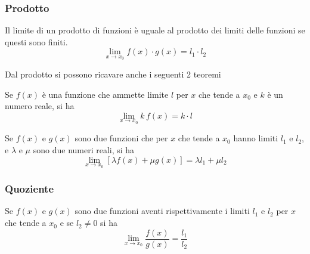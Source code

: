 \subsubsection{Prodotto}
\begin{prodottoLimiti}\hypertarget{teor:prodottoLimiti}{}
  Il limite di un prodotto di funzioni è uguale al prodotto dei limiti delle funzioni se questi sono
  finiti.
  \begin{equation*}
    \lim\limits_{x\to x_0}f(x)\cdot g(x)=l_1\cdot l_2
  \end{equation*}
\end{prodottoLimiti}
Dal prodotto si possono ricavare anche i seguenti 2 teoremi
\begin{prodottoLimiti1}
  Se $f(x)$ è una funzione che ammette limite $l$ per $x$ che tende a $x_0$ e $k$ è un numero reale,
  si ha
  \begin{equation*}
    \lim\limits_{x\to x_0}k\,f(x) = k\cdot l
  \end{equation*}
\end{prodottoLimiti1}
\begin{prodottoLimiti2}
  Se $f(x)$ e $g(x)$ sono due funzioni che per $x$ che tende a $x_0$ hanno limiti $l_1$ e $l_2$, e
  $\lambda$ e $\mu$ sono due numeri reali, si ha
  \begin{equation*}
    \lim\limits_{x\to x_0}[\lambda f(x)+\mu g(x)]=\lambda l_1+\mu l_2
  \end{equation*}
\end{prodottoLimiti2}

\subsubsection{Quoziente}
\begin{quozienteLimiti}
  Se $f(x)$ e $g(x)$ sono due funzioni aventi rispettivamente i limiti $l_1$ e $l_2$ per $x$ che 
  tende a $x_0$ e se $l_2\neq0$ si ha
  \begin{equation*}
    \lim\limits_{x\to x_0}\frac{f(x)}{g(x)}=\frac{l_1}{l_2}
  \end{equation*}
\end{quozienteLimiti}

